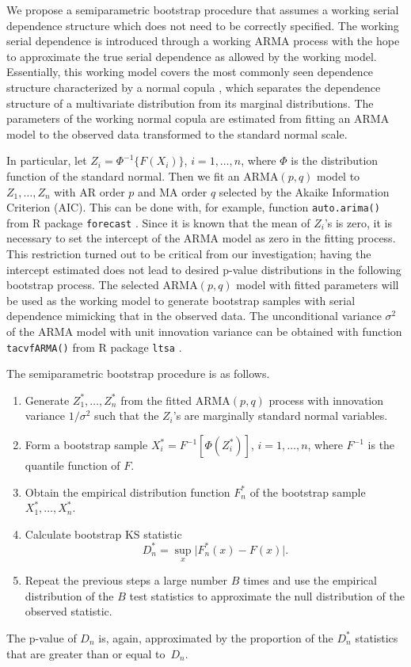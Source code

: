 \documentclass[12pt, letterpaper, titlepage]{article}
\begin{document}
We propose a semiparametric bootstrap procedure that assumes a working serial
dependence structure which does not need to be correctly specified. The working
serial dependence is introduced through a working ARMA process with the hope to
approximate the true serial dependence as allowed by the working
model. Essentially, this working model covers the most commonly seen dependence
structure characterized by a normal copula \citep{hofert2018elements}, which
separates the dependence structure
of a multivariate distribution from its marginal distributions. 
The parameters of the working normal copula are
estimated from fitting an ARMA model to the
observed data transformed to the standard normal scale.


In particular, let
$Z_i = \Phi^{-1}\{ F(X_i)\}$, $i = 1, \ldots, n$, where $\Phi$ is the distribution
function of the standard normal. Then we fit an ARMA$(p, q)$ model to
$Z_1, \ldots, Z_n$ with AR order $p$ and MA order $q$ selected by the Akaike
Information Criterion (AIC). This can be done with, for example, function
\texttt{auto.arima()} from  R package \texttt{forecast}
\citep{hyndman2008automatic}. Since it is known that the mean of $Z_i$'s is
zero, it is necessary to set the intercept of the ARMA model as zero in the
fitting process. This restriction turned out to be critical from our
investigation; having the intercept estimated does not lead to desired p-value
distributions in the following bootstrap process.
The selected ARMA$(p, q)$ model with fitted
parameters will be used as the working model to generate bootstrap samples with
serial dependence mimicking that in the observed data. The unconditional
variance $\sigma^2$ of the ARMA model with unit innovation variance can be
obtained with function
\texttt{tacvfARMA()} from R package \texttt{ltsa} \citep{mcleod2007algorithms}.


The semiparametric bootstrap procedure is as follows.
\begin{enumerate}
\item
  Generate $Z_1^*, \ldots, Z_n^*$ from the fitted ARMA$(p, q)$ process with
  innovation variance $1 / \sigma^2$ such that the $Z_i$'s are
	marginally standard normal variables.
\item
  Form a bootstrap sample $X_i^* = F^{-1} [\Phi(Z_i^*)]$,  $i = 1, \ldots, n$,
  where $F^{-1}$ is the quantile function of $F$.
\item
  Obtain the empirical distribution function $F_n^*$ of the bootstrap sample
  $X_1^*, \ldots, X_n^*$.
\item
  Calculate bootstrap KS statistic
  \[
    D_n^* = \sup_x \lvert F_n^* (x)- F(x) \rvert.
  \]
\item
  Repeat the previous steps a large number $B$ times and use the empirical
  distribution of the $B$ test statistics to approximate
  the null distribution of the observed statistic.
\end{enumerate}
The p-value of $D_n$ is, again, approximated by the proportion of the $D_n^*$
statistics that are greater than or equal to~$D_n$. 
\end{document}
